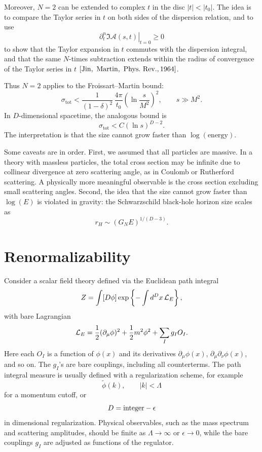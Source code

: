 Moreover, \(N=2\) can be extended to complex \(t\) in the disc
\(|t|<|t_0|\).  The idea is to compare the Taylor series in \(t\) on
both sides of the dispersion relation, and to use
\[
  \left.
  \partial_t^n\Im\mathcal A(s,t)
  \right|_{t=0}\geq0
\]
to show that the Taylor expansion in \(t\) commutes with the dispersion
integral, and that the same \(N\)-times subtraction extends within the
radius of convergence of the Taylor series in \(t\)
\([{\rm Jin,\ Martin,\ Phys.\ Rev.}, 1964]\).

Thus \(N=2\) applies to the Froissart--Martin bound:
\[
  \sigma_{\mathrm{tot}}
  <
  \frac{1}{(1-\delta)^2}\,
  \frac{4\pi}{t_0}
  \left(\ln\frac{s}{M^2}\right)^2,
  \qquad s\gg M^2.
\]
In \(D\)-dimensional spacetime, the analogous bound is
\[
  \sigma_{\mathrm{tot}}<C(\ln s)^{D-2}.
\]
The interpretation is that the size cannot grow faster than
\(\log(\text{energy})\).

Some caveats are in order.  First, we assumed that all particles are
massive.  In a theory with massless particles, the total cross section
may be infinite due to collinear divergence at zero scattering angle, as
in Coulomb or Rutherford scattering.  A physically more meaningful
observable is the cross section excluding small scattering angles.
Second, the idea that the size cannot grow faster than \(\log(E)\) is
violated in gravity: the Schwarzschild black-hole horizon size scales as
\[
  r_H\sim (G_N E)^{1/(D-3)}.
\]

\section{Renormalizability}

Consider a scalar field theory defined via the Euclidean path integral
\[
  Z=\int [D\phi]\exp\left\{-\int d^D x\,{\cal L}_E\right\},
\]
with bare Lagrangian
\[
  {\cal L}_E
  =\frac{1}{2}(\partial_\mu\phi)^2+\frac{1}{2}m^2\phi^2
  +\sum_I g_I O_I .
\]
Here each \(O_I\) is a function of \(\phi(x)\) and its derivatives
\(\partial_\mu\phi(x)\), \(\partial_\mu\partial_\nu\phi(x)\), and so on.  The
\(g_I\)'s are bare couplings, including all counterterms.  The path integral
measure is usually defined with a regularization scheme, for example
\[
  \widetilde\phi(k),\qquad |k|<\Lambda
\]
for a momentum cutoff, or
\[
  D=\hbox{integer}-\epsilon
\]
in dimensional regularization.  Physical observables, such as the mass
spectrum and scattering amplitudes, should be finite as
\(\Lambda\to\infty\) or \(\epsilon\to 0\), while the bare couplings \(g_I\)
are adjusted as functions of the regulator.

